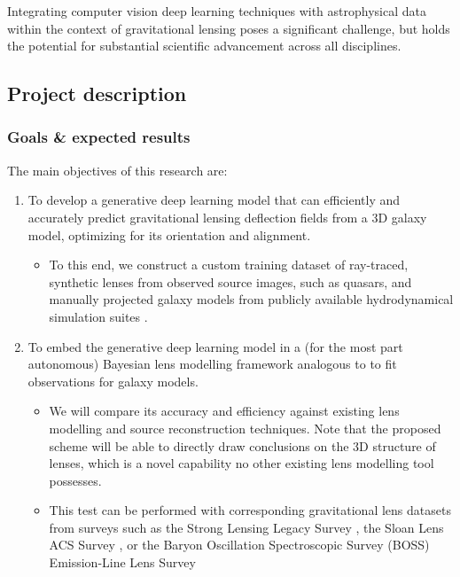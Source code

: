 \documentclass[a4paper,10pt]{article}
\begin{document}
Integrating computer vision deep learning techniques with
astrophysical data within the context of gravitational lensing poses a
significant challenge, but holds the potential for substantial
scientific advancement across all disciplines.

\subsection{Project description}
\label{sec:orgd7afbe7}

\subsubsection{Goals \& expected results}
\label{sec:org1ebee56}
\label{sec:goals}

The main objectives of this research are:
\begin{enumerate}[leftmargin=*, noitemsep]
\item To develop a generative deep learning model that can efficiently
and accurately predict gravitational lensing deflection fields from
a 3D galaxy model, optimizing for its orientation and alignment.
\begin{itemize}[leftmargin=*]
\item To this end, we construct a custom training dataset of
ray-traced, synthetic lenses from observed source images, such as
quasars, and manually projected galaxy models from publicly
available hydrodynamical simulation suites
\citep{Springel17,Nelson18,Dave19}.
\end{itemize}
\item To embed the generative deep learning model in a (for the most part
autonomous) Bayesian lens modelling framework analogous to
\cite{Adam22,Denzel21,Morningstar19,Hezaveh17} to fit
observations for galaxy models.
\begin{itemize}[leftmargin=*]
\item We will compare its accuracy and efficiency against existing lens
modelling and source reconstruction techniques. Note that the
proposed scheme will be able to directly draw conclusions on the
3D structure of lenses, which is a novel capability no other
existing lens modelling tool possesses.
\item This test can be performed with corresponding gravitational lens
datasets from surveys such as the Strong Lensing Legacy Survey
\citep[SL2S:][]{Gavazzi12,Sonnenfeld15}, the Sloan Lens ACS
Survey \citep[SLACS:][]{Bolton2006,Shu17}, or the Baryon
Oscillation Spectroscopic Survey (BOSS) Emission-Line Lens Survey

\end{itemize}
\end{enumerate}
\end{document}
